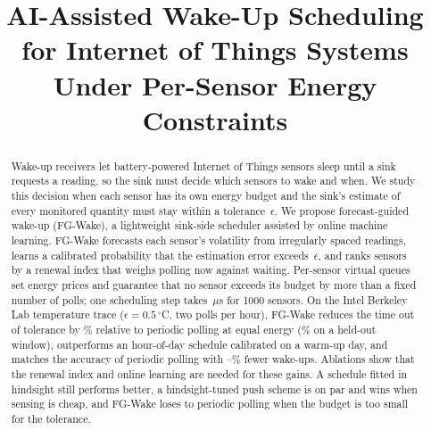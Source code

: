 \documentclass[conference]{IEEEtran}
\begin{document}
\title{AI-Assisted Wake-Up Scheduling\\for Internet of Things Systems\\Under Per-Sensor Energy Constraints}

\author{
}

\maketitle

\begin{abstract}
Wake-up receivers let battery-powered Internet of Things sensors sleep until a sink requests a
reading, so the sink must decide which sensors to wake and when. We study this decision when each
sensor has its own energy budget and the sink's estimate of every monitored quantity must stay
within a tolerance~$\epsilon$. We propose forecast-guided wake-up (FG-Wake), a lightweight
sink-side scheduler assisted by online machine learning. FG-Wake forecasts each sensor's
volatility from irregularly spaced readings, learns a calibrated probability that the estimation
error exceeds~$\epsilon$, and ranks sensors by a renewal index that weighs polling now against
waiting. Per-sensor virtual queues set energy prices and guarantee that no sensor exceeds its
budget by more than a fixed number of polls; one scheduling step takes \RtFGbig\,$\mu$s for
1000 sensors. On the Intel Berkeley Lab temperature trace ($\epsilon=0.5\,^\circ$C, two polls
per hour), FG-Wake reduces the time out of tolerance by \TrRed\% relative to periodic polling at
equal energy (\HoRed\% on a held-out window), outperforms an hour-of-day schedule calibrated on a
warm-up day, and matches the accuracy of periodic polling with \TrSaveLin--\TrSave\% fewer
wake-ups. Ablations show that the renewal index and online learning are needed for these gains.
A schedule fitted in hindsight still performs better, a hindsight-tuned push scheme is on par and
wins when sensing is cheap, and FG-Wake loses to periodic polling when the budget is too small
for the tolerance.
\end{abstract}
\end{document}
